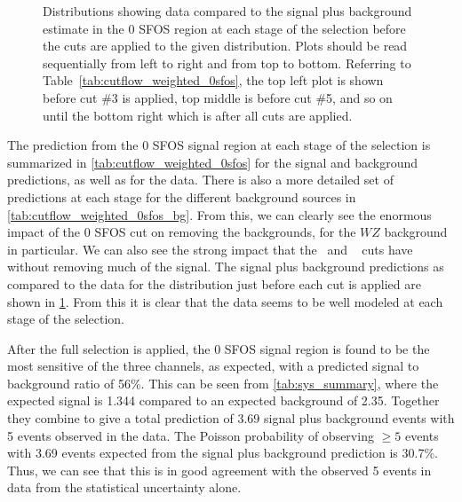 \begin{figure}[ht!]
\caption{Distributions showing data compared to the signal plus background estimate in the 0 SFOS region at each stage 
of the selection before the cuts are applied to the given distribution. 
Plots should be read sequentially from left to right
and from top to bottom. 
Referring to Table~\ref{tab:cutflow_weighted_0sfos}, the top left
plot is shown before cut \#3 is applied, top middle is before cut \#5, and
so on until the bottom right which is after all cuts are applied.
}
\label{fig:0sfos}
\end{figure}

The prediction from the 0 SFOS signal region at each stage of the selection
is summarized in 
\tab\ref{tab:cutflow_weighted_0sfos}
for the signal and background predictions, as well as for the data.
There is also a more detailed set of predictions at each stage for the 
different background sources in 
\tab\ref{tab:cutflow_weighted_0sfos_bg}. 
From this, we can clearly see the enormous impact of the 0 SFOS
cut on removing the backgrounds, for the $WZ$ background in particular.
We can also see the strong impact that the \nbjet~and \deltaphi~
cuts have without removing much of the signal.
The signal plus background predictions as 
compared to the data
for the distribution just before each cut is applied are shown in 
\fig\ref{fig:0sfos}. From this it is clear
that the data seems to be well modeled at each stage of the selection.

After the full selection is applied,
the 0 SFOS signal region is found to be the most sensitive of the three
channels, as expected, with a predicted signal to background ratio of 56\%.
This can be seen from \tab\ref{tab:sys_summary}, where the expected signal
is 1.344 compared to an expected background of 2.35. Together they 
combine to give a total prediction of 3.69 signal plus background events 
with 5 events observed in the data.
The Poisson probability of observing $\geq 5$ events with 3.69 events expected 
from the signal plus background prediction is 30.7\%. 
Thus, we can see that this is in good agreement with the observed 5 events in data
from the statistical uncertainty alone. 

